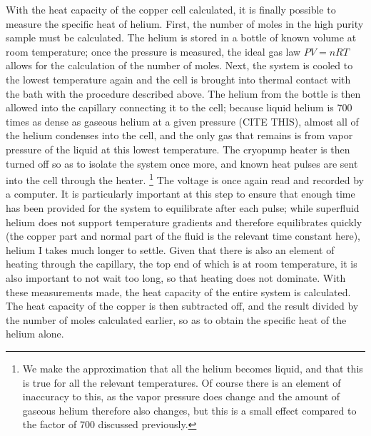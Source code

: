 With the heat capacity of the copper cell calculated, it is finally possible to measure the specific heat of helium. First, the number of moles in the high purity sample must be calculated. The helium is stored in a bottle of known volume at room temperature; once the pressure is measured, the ideal gas law $P V = n R T$ allows for the calculation of the number of moles. Next, the system is cooled to the lowest temperature again and the cell is brought into thermal contact with the bath with the procedure described above. The helium from the bottle is then allowed into the capillary connecting it to the cell; because liquid helium is 700 times as dense as gaseous helium at a given pressure (CITE THIS), almost all of the helium condenses into the cell, and the only gas that remains is from vapor pressure of the liquid at this lowest temperature. The cryopump heater is then turned off so as to isolate the system once more, and known heat pulses are sent into the cell through the heater. \footnote{We make the approximation that all the helium becomes liquid, and that this is true for all the relevant temperatures. Of course there is an element of inaccuracy to this, as the vapor pressure does change and the amount of gaseous helium therefore also changes, but this is a small effect compared to the factor of 700 discussed previously.} The voltage is once again read and recorded by a computer. It is particularly important at this step to ensure that enough time has been provided for the system to equilibrate after each pulse; while superfluid helium does not support temperature gradients and therefore equilibrates quickly (the copper part and normal part of the fluid is the relevant time constant here), helium I takes much longer to settle. Given that there is also an element of heating through the capillary, the top end of which is at room temperature, it is also important to not wait too long, so that heating does not dominate.  With these measurements made, the heat capacity of the entire system is calculated. The heat capacity of the copper is then subtracted off, and the result divided by the number of moles calculated earlier, so as to obtain the specific heat of the helium alone.